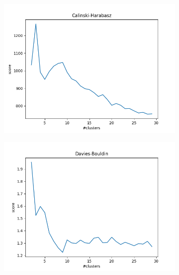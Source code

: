 \documentclass{article}
\begin{document}
\begin{figure}[H]
\begin{subfigure}{.33\textwidth}
  \centering
  \includegraphics[width=1\linewidth]{2f/Dogs/Calinski.png}  
  
  \label{fig:sub-first}
\end{subfigure}
\begin{subfigure}{.33\textwidth}
  \centering
  \includegraphics[width=1\linewidth]{2f/Dogs/Davies.png}  
  

\end{subfigure}
\end{figure}
\end{document}
